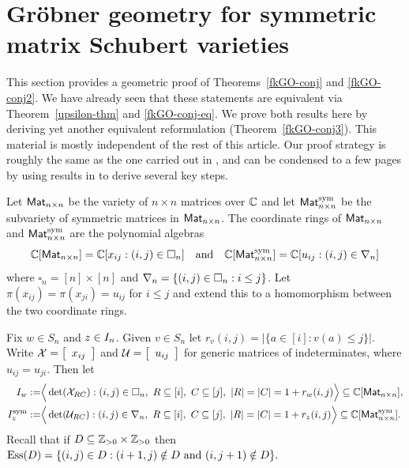 \documentclass[10pt]{article}
\begin{document}

\appendix

\section{Gr\"obner geometry for symmetric matrix Schubert varieties}\label{app-sect2}

This section provides a geometric proof of Theorems~\ref{fkGO-conj} and \ref{fkGO-conj2}.
We have already seen that these statements are equivalent via Theorem~\ref{upsilon-thm} and \eqref{fkGO-conj-eq}. We prove both results here by deriving yet another equivalent reformulation (Theorem~\ref{fkGO-conj3}). 
%
This material is mostly independent of the rest of this article. Our proof strategy is roughly the same as the one carried out in \cite[\S4.4]{MarPaw2022},
and can be condensed to a few pages 
by using results in \cite{GMN,GrahamKreimanB,KnutsonMillerSubword,KnutsonMillerYong} to derive several key steps.

Let $\Mat_{n\times n}$ be the variety of $n\times n$ matrices over $\CC$ and let $\SymMat_{n\times n} $  be the subvariety of symmetric matrices in $\Mat_{n\times n}$. 
The coordinate rings of $\Mat_{n\times n}$ and $\SymMat_{n\times n}$
are the polynomial algebras 
\[
 \CC[\Mat_{n\times n}] = \CC[x_{ij} : (i,j) \in \square_n]
 \quand
  \CC[\SymMat_{n\times n}] = \CC[u_{ij} : (i,j) \in \UT_n]
 \]
 where $\square_n = [n]\times [n]$ and $\UT_n = \{(i,j) \in \square_n : i\leq j\}$. 
 Let $\pi(x_{ij}) = \pi(x_{ji}) = u_{ij}$ for $i\leq j$ and extend this to a homomorphism between the two coordinate rings.
 
 Fix $w \in S_n$ and $z \in \Invol$.
 Given $v \in S_n$ let $r_v(i,j) = |\{a \in [i] : v(a) \leq j\}|$.
Write $\cX = \mat{{r} x_{ij}}$ and $\cU = \mat{{r} u_{ij}}$
for generic matrices of indeterminates, where $u_{ij}=u_{ji}$.
Then let
\[
\ba
I_w &:= \Bigr\langle \det(\cX_{RC}) : (i,j)\in\square_n,\ R \subseteq [i],\ C\subseteq[j],\ |R|=|C|=1+r_w(i,j) \Bigr\rangle\subseteq \CC[\Mat_{n\times n}],
\\
\SymI_z &:= \Bigr\langle \det(\cU_{RC}) :(i,j)\in\UT_n,\ R \subseteq [i],\ C\subseteq[j],\ |R|=|C|=1+r_z(i,j) \Bigr\rangle\subseteq \CC[\SymMat_{n\times n}].
\ea
\]
Recall that if $D \subseteq \PP\times \PP$ then $\Ess(D)=  \{ (i,j) \in D: (i+1,j)\notin D\text{ and }(i,j+1) \notin D\}.$
\end{document}
